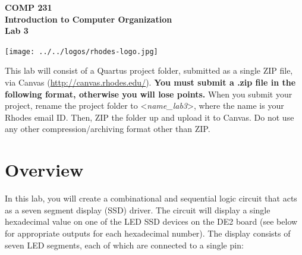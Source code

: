 \documentclass[10pt]{article}
\begin{document}

\hspace{-5mm}
\begin{minipage}{0.65\linewidth}
  \textbf{{\Large COMP 231\\
      Introduction to Computer Organization\\Lab 3}}
\end{minipage}
\begin{minipage}{0.35\linewidth}
  \texttt{[image: ../../logos/rhodes-logo.jpg]}
\end{minipage}

\vspace{.25in}

This lab will consist of a Quartus project folder, submitted as a
single ZIP file, via Canvas (\url{http://canvas.rhodes.edu/}).
{\bf You must submit a .zip file in the following format, otherwise
  you will lose points.} When you submit your project, rename the
project folder to <{\em name\_lab3}>, where the name is your Rhodes
email ID. Then, ZIP the folder up and upload it to Canvas. Do not
use any other compression/archiving format other than ZIP.

\section*{Overview}

In this lab, you will create a combinational and sequential logic
circuit that acts as a seven segment display (SSD) driver. The
circuit will display a single hexadecimal value on one of the LED SSD
devices on the DE2 board (see below for appropriate outputs for each hexadecimal number). The display consists of seven LED segments,
each of which are connected to a single pin:
\end{document}
